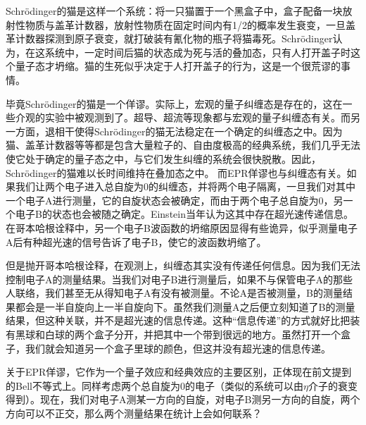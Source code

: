 \documentclass{ctexart}
\begin{document}
Schrödinger的猫是这样一个系统：将一只猫置于一个黑盒子中，盒子配备一块放射性物质与盖革计数器，放射性物质在固定时间内有1/2的概率发生衰变，一旦盖革计数器探测到原子衰变，就打破装有氰化物的瓶子将猫毒死。Schrödinger认为，在这系统中，一定时间后猫的状态成为死与活的叠加态，只有人打开盖子时这个量子态才坍缩。猫的生死似乎决定于人打开盖子的行为，这是一个很荒谬的事情。


毕竟Schrödinger的猫是一个佯谬。实际上，宏观的量子纠缠态是存在的，这在一些介观的实验中被观测到了。超导、超流等现象都与宏观的量子纠缠态有关。而另一方面，退相干使得Schrödinger的猫无法稳定在一个确定的纠缠态之中。因为猫、盖革计数器等等都是包含大量粒子的、自由度极高的经典系统，我们几乎无法使它处于确定的量子态之中，与它们发生纠缠的系统会很快脱散。因此，Schrödinger的猫难以长时间维持在叠加态之中。
而EPR佯谬也与纠缠态有关。如果我们让两个电子进入总自旋为0的纠缠态，并将两个电子隔离，一旦我们对其中一个电子A进行测量，它的自旋状态会被确定，而由于两个电子总自旋为0，另一个电子B的状态也会被随之确定。Einstein当年认为这其中存在超光速传递信息。在哥本哈根诠释中，另一个电子B波函数的坍缩原因显得有些诡异，似乎测量电子A后有种超光速的信号告诉了电子B，使它的波函数坍缩了。

但是抛开哥本哈根诠释，在观测上，纠缠态其实没有传递任何信息。因为我们无法控制电子A的测量结果。当我们对电子B进行测量后，如果不与保管电子A的那些人联络，我们甚至无从得知电子A有没有被测量。不论A是否被测量，B的测量结果都会是一半自旋向上一半自旋向下。虽然我们测量A之后便立刻知道了B的测量结果，但这种关联，并不是超光速的信息传递。这种“信息传递”的方式就好比把装有黑球和白球的两个盒子分开，并把其中一个带到很远的地方。虽然打开一个盒子，我们就会知道另一个盒子里球的颜色，但这并没有超光速的信息传递。

关于EPR佯谬，它作为一个量子效应和经典效应的主要区别，正体现在前文提到的Bell不等式上。同样考虑两个总自旋为0的电子（类似的系统可以由$\eta$介子的衰变得到）。现在，我们对电子A测某一方向的自旋，对电子B测另一方向的自旋，两个方向可以不正交，那么两个测量结果在统计上会如何联系？
\end{document}
